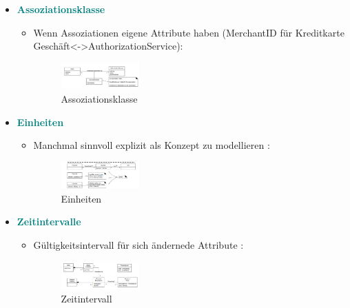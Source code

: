 \documentclass{article}
\begin{document}
\begin{itemize}
\begin{itemize}
\begin{multicols} {2}
\begin{figure}[H]
	\caption{\label{fig:DMRolleKonzept}DMRolleKonzept}
	\end{figure} 
			\end{multicols}
	\end{itemize}
	\item \textcolor {teal} {\textbf{Assoziationsklasse}}
	\begin{itemize}
		\item Wenn Assoziationen eigene Attribute haben (MerchantID für Kreditkarte Geschäft<->AuthorizationService): \begin{figure}[H]
				\centering
				\includegraphics[width=0.3\textwidth] {Resources/Images/Assoziationsklasse.png}
			\caption{\label{fig:Assoziationsklasse}Assoziationsklasse}
	\end{figure} 
	\end{itemize}
	\item \textcolor {teal} {\textbf{Einheiten}}
	\begin{itemize}
		\item Manchmal sinnvoll explizit als Konzept zu modellieren : \begin{figure}[H]
				\centering
				\includegraphics[width=0.3\textwidth] {Resources/Images/Einheiten.png}
			\caption{\label{fig:Einheiten}Einheiten}
	\end{figure} 
	\end{itemize}
	\item \textcolor {teal} {\textbf{Zeitintervalle}}
	\begin{itemize}
		\item Gültigkeitsintervall für sich ändernede Attribute : \begin{figure}[H]
				\centering
				\includegraphics[width=0.3\textwidth] {Resources/Images/Zeitintervall.png}
			\caption{\label{fig:Zeitintervall}Zeitintervall}
				\end{figure} 
	\end{itemize}
\end{itemize}
\end{document}
